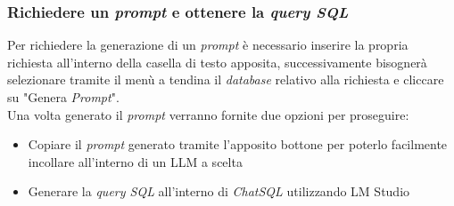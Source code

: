 \documentclass[5pt]{article}
\begin{document}
	    \subsubsection{Richiedere un \textit{prompt} e ottenere la \textit{query SQL}}
	    Per richiedere la generazione di un \textit{prompt} è necessario inserire la propria richiesta all'interno della casella di testo apposita, successivamente bisognerà selezionare tramite il menù a tendina il \textit{database} relativo alla richiesta e cliccare su "Genera \textit{Prompt}".\\
	    Una volta generato il \textit{prompt} verranno fornite due opzioni per proseguire:
	    \begin{itemize}
	    	\item Copiare il \textit{prompt} generato tramite l'apposito bottone per poterlo facilmente incollare all'interno di un LLM a scelta
	    	\item Generare la \textit{query SQL} all'interno di \textit{ChatSQL} utilizzando LM Studio
	    \end{itemize} 
\end{document}
